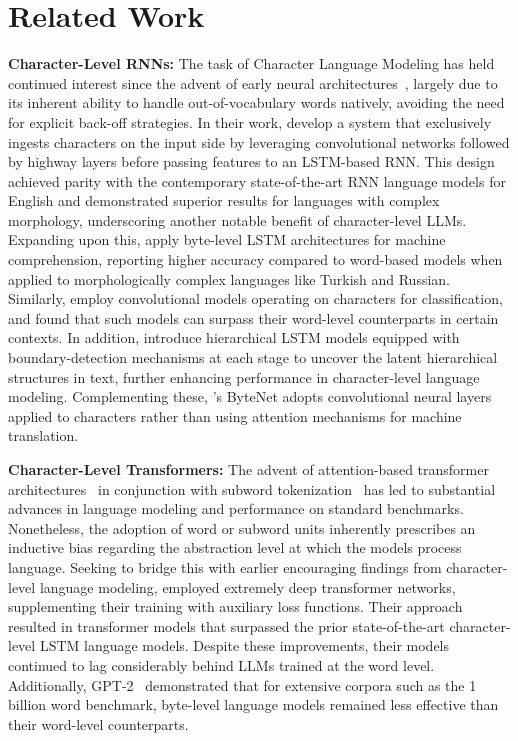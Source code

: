 \section{Related Work}
\label{section:related_work}

\textbf{Character-Level RNNs:} The task of Character Language Modeling has held continued interest since the advent of early neural architectures~\citep{sutskever2011generating,mikolov2012subword,graves2013generating}, largely due to its inherent ability to handle out-of-vocabulary words natively, avoiding the need for explicit back-off strategies. In their work, \cite{kim2016character} develop a system that exclusively ingests characters on the input side by leveraging convolutional networks followed by highway layers before passing features to an LSTM-based RNN. This design achieved parity with the contemporary state-of-the-art RNN language models for English and demonstrated superior results for languages with complex morphology, underscoring another notable benefit of character-level LLMs. Expanding upon this, \cite{kenter2018byte} apply byte-level LSTM architectures for machine comprehension, reporting higher accuracy compared to word-based models when applied to morphologically complex languages like Turkish and Russian. Similarly, \cite{zhang2015character} employ convolutional models operating on characters for classification, and found that such models can surpass their word-level counterparts in certain contexts. In addition, \citet{chung2019hierarchical} introduce hierarchical LSTM models equipped with boundary-detection mechanisms at each stage to uncover the latent hierarchical structures in text, further enhancing performance in character-level language modeling. Complementing these, \cite{kalchbrenner2016neural}'s ByteNet adopts convolutional neural layers applied to characters rather than using attention mechanisms for machine translation.

\textbf{Character-Level Transformers:} The advent of attention-based transformer architectures~\citep{vaswani2017attention} in conjunction with subword tokenization~\citep{sennrich-etal-2016-neural} has led to substantial advances in language modeling and performance on standard benchmarks. Nonetheless, the adoption of word or subword units inherently prescribes an inductive bias regarding the abstraction level at which the models process language. Seeking to bridge this with earlier encouraging findings from character-level language modeling, \citet{al2019character} employed extremely deep transformer networks, supplementing their training with auxiliary loss functions. Their approach resulted in transformer models that surpassed the prior state-of-the-art character-level LSTM language models. Despite these improvements, their models continued to lag considerably behind LLMs trained at the word level. Additionally, GPT-2~\citep{radfordgpt2} demonstrated that for extensive corpora such as the 1 billion word benchmark, byte-level language models remained less effective than their word-level counterparts.

